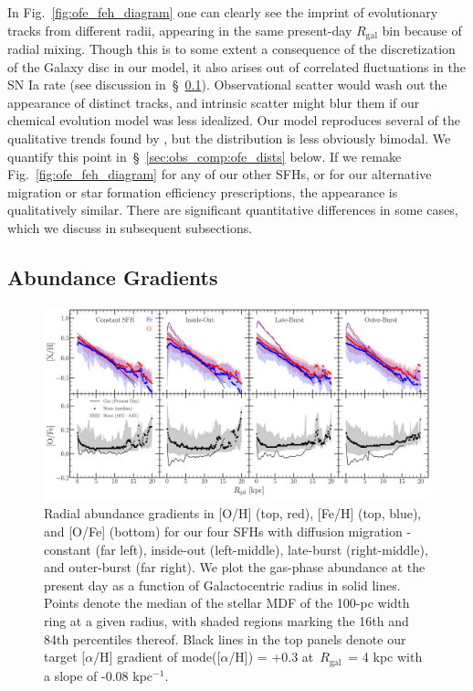 \documentclass[draft2.tex]{subfiles}
\begin{document}
In Fig.~\ref{fig:ofe_feh_diagram} one can clearly see the imprint of 
evolutionary tracks from different radii, appearing in the same present-day 
$R_\text{gal}$ bin because of radial mixing. 
Though this is to some extent a consequence of the discretization of the 
Galaxy disc in our model, it also arises out of correlated fluctuations in the 
SN Ia rate (see discussion in~\S~\ref{sec:obs_comp:gradient}). 
Observational scatter would wash out the appearance of distinct tracks, and 
intrinsic scatter might blur them if our chemical evolution model was less 
idealized. 
Our model reproduces several of the qualitative trends found by 
\citet{Hayden2015}, but the distribution is less obviously bimodal. 
We quantify this point in~\S~\ref{sec:obs_comp:ofe_dists} below. 
If we remake Fig.~\ref{fig:ofe_feh_diagram} for any of our other SFHs, or for 
our alternative migration or star formation efficiency prescriptions, the 
appearance is qualitatively similar. There are significant quantitative 
differences in some cases, which we discuss in subsequent subsections. 

\subsection{Abundance Gradients} 
\label{sec:obs_comp:gradient} 

\begin{figure} 
\centering 
\includegraphics[scale = 0.32]{metallicity_gradient.pdf} 
\caption{Radial abundance gradients in [O/H] (top, red), [Fe/H] (top, blue), 
and [O/Fe] (bottom) for our four SFHs with diffusion migration - constant (far 
left), inside-out (left-middle), late-burst (right-middle), and outer-burst 
(far right). We plot the gas-phase abundance at the present day as a function 
of Galactocentric radius in solid lines. Points denote the median of the stellar 
MDF of the 100-pc width ring at a given radius, with shaded regions marking 
the 16th and 84th percentiles thereof. Black lines in the top panels denote our 
target [$\alpha$/H] gradient of mode([$\alpha$/H]) = +0.3 at~$R_\text{gal}$~= 
4 kpc with a slope of -0.08 kpc$^{-1}$. } 
\label{fig:metallicity_gradient} 
\end{figure} 
\end{document}
